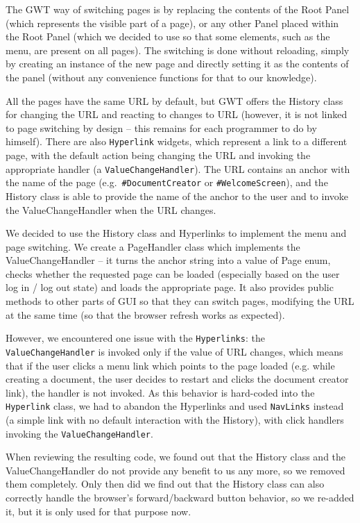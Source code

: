 The GWT way of switching pages is by replacing the contents of the Root Panel (which represents the visible part of a page), or any other Panel placed within the Root Panel (which we decided to use so that some elements, such as the menu, are present on all pages). The switching is done without reloading, simply by creating an instance of the new page and directly setting it as the contents of the panel (without any convenience functions for that to our knowledge).

All the pages have the same URL by default, but GWT offers the History class for changing the URL and reacting to changes to URL (however, it is not linked to page switching by design -- this remains for each programmer to do by himself). There are also {\tt Hyperlink} widgets, which represent a link to a different page, with the default action being changing the URL and invoking the appropriate handler (a {\tt ValueChangeHandler}).
The URL contains an anchor with the name of the page (e.g.\ {\tt \#DocumentCreator} or {\tt \#WelcomeScreen}), and the History class is able to provide the name of the anchor to the user and to invoke the ValueChangeHandler when the URL changes.

We decided to use the History class and Hyperlinks to implement the menu and page switching. We create a PageHandler class which implements the ValueChangeHandler -- it turns the anchor string into a value of Page enum, checks whether the requested page can be loaded (especially based on the user log in / log out state) and loads the appropriate page. It also provides public methods to other parts of GUI so that they can switch pages, modifying the URL at the same time (so that the browser refresh works as expected).

However, we encountered one issue with the {\tt Hyperlinks}: the {\tt ValueChangeHandler} is invoked only if the value of URL changes, which means that if the user clicks a menu link which points to the page loaded (e.g. while creating a document, the user decides to restart and clicks the document creator link), the handler is not invoked. As this behavior is hard-coded into the {\tt Hyperlink} class, we had to abandon the Hyperlinks and used {\tt NavLinks} instead (a simple link with no default interaction with the History), with click handlers invoking the {\tt ValueChangeHandler}.

When reviewing the resulting code, we found out that the History class and the ValueChangeHandler do not provide any benefit to us any more, so we removed them completely. Only then did we find out that the History class can also correctly handle the browser's forward/backward button behavior, so we re-added it, but it is only used for that purpose now.

